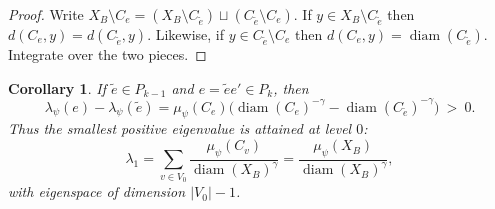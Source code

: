\documentclass[12pt]{amsart}
\theoremstyle{plain}
\newtheorem{corollary}{Corollary}[section]
\theoremstyle{definition}
\begin{document}
\begin{proof}
Write $X_B\setminus C_e=(X_B\setminus C_{\tilde e})\sqcup (C_{\tilde e}\setminus C_e)$. If $y\in X_B\setminus C_{\tilde e}$ then
$d(C_e,y)=d(C_{\tilde e},y)$. Likewise, if $y\in C_{\tilde e}\setminus C_e$ then $d(C_e,y)=\operatorname{diam}(C_{\tilde e})$. Integrate over the two pieces.
\end{proof}

\begin{corollary}
\label{cor:gap-cylinder}
If $\tilde e \in P_{k-1}$ and $e = \tilde{e}e'\in P_k$, then
\[
\lambda_\psi(e)-\lambda_\psi(\tilde e)
=\mu_\psi(C_e)\Big(\operatorname{diam}(C_e)^{-\gamma}-\operatorname{diam}(C_{\tilde e})^{-\gamma}\Big)\ >\ 0.
\]
Thus the smallest positive eigenvalue is attained at level $0$:
\[
\lambda_1=\sum_{v\in V_0}\frac{\mu_\psi(C_v)}{\operatorname{diam}(X_B)^\gamma}
=\frac{\mu_\psi(X_B)}{\operatorname{diam}(X_B)^\gamma},
\]
with eigenspace of dimension $|V_0|-1$.
\end{corollary}
\end{document}
